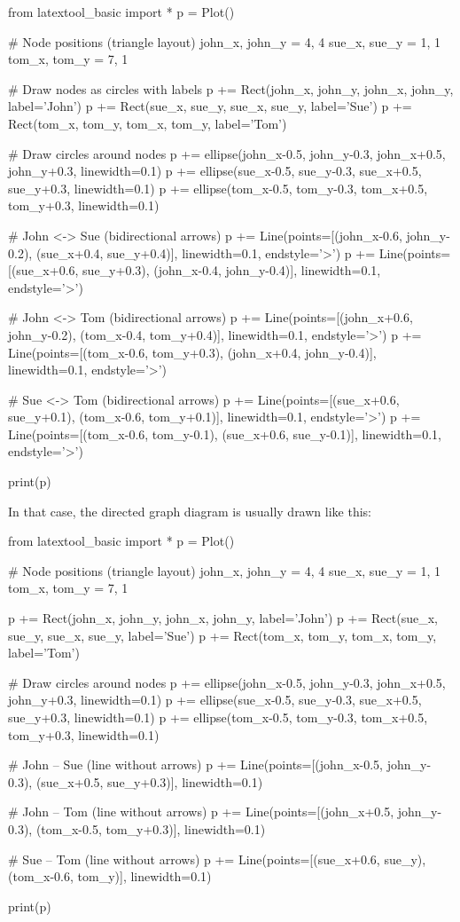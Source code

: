 \begin{python}
from latextool_basic import *
p = Plot()

# Node positions (triangle layout)
john_x, john_y = 4, 4
sue_x, sue_y = 1, 1
tom_x, tom_y = 7, 1

# Draw nodes as circles with labels
p += Rect(john_x, john_y, john_x, john_y, label='John')
p += Rect(sue_x, sue_y, sue_x, sue_y, label='Sue')
p += Rect(tom_x, tom_y, tom_x, tom_y, label='Tom')

# Draw circles around nodes
p += ellipse(john_x-0.5, john_y-0.3, john_x+0.5, john_y+0.3, linewidth=0.1)
p += ellipse(sue_x-0.5, sue_y-0.3, sue_x+0.5, sue_y+0.3, linewidth=0.1)
p += ellipse(tom_x-0.5, tom_y-0.3, tom_x+0.5, tom_y+0.3, linewidth=0.1)

# John <-> Sue (bidirectional arrows)
p += Line(points=[(john_x-0.6, john_y-0.2), (sue_x+0.4, sue_y+0.4)], linewidth=0.1, endstyle='>')
p += Line(points=[(sue_x+0.6, sue_y+0.3), (john_x-0.4, john_y-0.4)], linewidth=0.1, endstyle='>')

# John <-> Tom (bidirectional arrows)
p += Line(points=[(john_x+0.6, john_y-0.2), (tom_x-0.4, tom_y+0.4)], linewidth=0.1, endstyle='>')
p += Line(points=[(tom_x-0.6, tom_y+0.3), (john_x+0.4, john_y-0.4)], linewidth=0.1, endstyle='>')

# Sue <-> Tom (bidirectional arrows)
p += Line(points=[(sue_x+0.6, sue_y+0.1), (tom_x-0.6, tom_y+0.1)], linewidth=0.1, endstyle='>')
p += Line(points=[(tom_x-0.6, tom_y-0.1), (sue_x+0.6, sue_y-0.1)], linewidth=0.1, endstyle='>')

print(p)
\end{python}

In that case, the directed graph diagram is usually drawn like this:

\begin{python}
from latextool_basic import *
p = Plot()

# Node positions (triangle layout)
john_x, john_y = 4, 4
sue_x, sue_y = 1, 1
tom_x, tom_y = 7, 1

p += Rect(john_x, john_y, john_x, john_y, label='John')
p += Rect(sue_x, sue_y, sue_x, sue_y, label='Sue')
p += Rect(tom_x, tom_y, tom_x, tom_y, label='Tom')

# Draw circles around nodes
p += ellipse(john_x-0.5, john_y-0.3, john_x+0.5, john_y+0.3, linewidth=0.1)
p += ellipse(sue_x-0.5, sue_y-0.3, sue_x+0.5, sue_y+0.3, linewidth=0.1)
p += ellipse(tom_x-0.5, tom_y-0.3, tom_x+0.5, tom_y+0.3, linewidth=0.1)

# John -- Sue (line without arrows)
p += Line(points=[(john_x-0.5, john_y-0.3), (sue_x+0.5, sue_y+0.3)], linewidth=0.1)

# John -- Tom (line without arrows)
p += Line(points=[(john_x+0.5, john_y-0.3), (tom_x-0.5, tom_y+0.3)], linewidth=0.1)

# Sue -- Tom (line without arrows)
p += Line(points=[(sue_x+0.6, sue_y), (tom_x-0.6, tom_y)], linewidth=0.1)

print(p)
\end{python}

